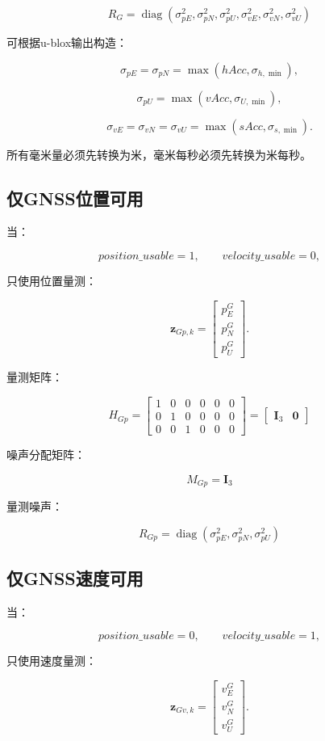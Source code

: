 \documentclass[12pt,a4paper]{ctexart}
\newcommand{\I}{\mathbf I}
\newcommand{\zero}{\mathbf 0}
\newcommand{\diag}{\operatorname{diag}}
\begin{document}
\[
\boxed{
R_G =
\diag\left(
\sigma_{pE}^2,
\sigma_{pN}^2,
\sigma_{pU}^2,
\sigma_{vE}^2,
\sigma_{vN}^2,
\sigma_{vU}^2
\right)
}
\]

可根据u-blox输出构造：

\[
\sigma_{pE}=\sigma_{pN}
=
\max\left(hAcc,\sigma_{h,\min}\right),
\]

\[
\sigma_{pU}
=
\max\left(vAcc,\sigma_{U,\min}\right),
\]

\[
\sigma_{vE}=\sigma_{vN}=\sigma_{vU}
=
\max\left(sAcc,\sigma_{s,\min}\right).
\]

所有毫米量必须先转换为米，毫米每秒必须先转换为米每秒。

\subsection{仅GNSS位置可用}

当：

\[
position\_usable=1,
\qquad
velocity\_usable=0,
\]

只使用位置量测：

\[
\mathbf z_{Gp,k}
=
\begin{bmatrix}
p_E^G\\p_N^G\\p_U^G
\end{bmatrix}.
\]

量测矩阵：

\[
\boxed{
H_{Gp}
=
\begin{bmatrix}
1&0&0&0&0&0\\
0&1&0&0&0&0\\
0&0&1&0&0&0
\end{bmatrix}
=
\begin{bmatrix}
\I_3&\zero
\end{bmatrix}
}
\]

噪声分配矩阵：

\[
\boxed{M_{Gp}=\I_3}
\]

量测噪声：

\[
\boxed{
R_{Gp}
=
\diag\left(
\sigma_{pE}^2,
\sigma_{pN}^2,
\sigma_{pU}^2
\right)
}
\]

\subsection{仅GNSS速度可用}

当：

\[
position\_usable=0,
\qquad
velocity\_usable=1,
\]

只使用速度量测：

\[
\mathbf z_{Gv,k}
=
\begin{bmatrix}
v_E^G\\v_N^G\\v_U^G
\end{bmatrix}.
\]
\end{document}
